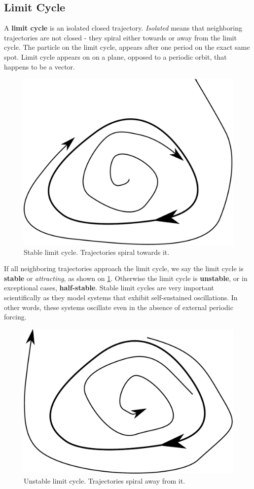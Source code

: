 \documentclass[journal]{IEEEtran}
\begin{document}
\subsection{Limit Cycle}
A \textbf{limit cycle} is an isolated closed trajectory. \textit{Isolated} means that neighboring trajectories are not closed - they spiral either towards or away from the limit cycle. The particle on the limit cycle, appears after one period on the exact same spot. Limit cycle appears on on a plane, opposed to a periodic orbit, that happens to be a vector.

\begin{figure}[ht!]
	\centering
	\includegraphics[width=.6\linewidth]{lcycle_stable}
	\caption{Stable limit cycle. Trajectories spiral towards it.}
	\label{f:lc_st}
\end{figure}

If all neighboring trajectories approach the limit cycle, we say the limit cycle is \textbf{stable} or \textit{attracting}, as shown on \cref{f:lc_st}. Otherwise the limit cycle is \textbf{unstable}, or in exceptional cases, \textbf{half-stable}. Stable limit cycles are very important scientifically as they model systems that exhibit self-sustained oscillations. In other words, these systems oscillate even in the absence of external periodic forcing. 

\begin{figure}[ht!]
	\centering
	\includegraphics[width=.55\linewidth]{lcycle_unstable}
	\caption{Unstable limit cycle. Trajectories spiral away from it.}
	\label{f:lc_unst}
\end{figure}
\end{document}
